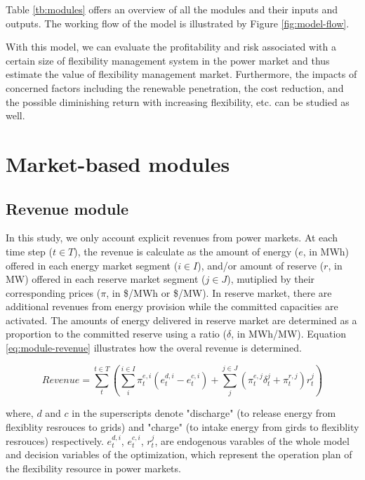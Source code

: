 Table \ref{tb:modules} offers an overview of all the modules and their inputs and outputs. The working flow of the model is illustrated by Figure \ref{fig:model-flow}.

With this model, we can evaluate the profitability and risk associated with a certain size of flexibility management system in the power market and thus estimate the value of flexibility management market. Furthermore, the impacts of concerned factors including the renewable penetration, the cost reduction, and the possible diminishing return with increasing flexibility, etc. can be studied as well.
\section{Market-based modules}

\subsection{Revenue module}

In this study, we only account explicit revenues from power markets. At each time step ($t \in T$), the revenue is calculate as the  amount of energy ($e$, in MWh) offered in each energy market segment ($i \in I$), and/or amount of reserve ($r$, in MW) offered in each reserve market segment ($j \in J$), mutiplied by their corresponding prices ($\pi$, in \$/MWh or \$/MW). In reserve market, there are additional revenues from energy provision while the committed capacities are activated. The amounts of energy delivered in reserve market are determined as a proportion to the committed reserve using a ratio ($\delta$, in MWh/MW). Equation \eqref{eq:module-revenue} illustrates how the overal revenue is determined. 

\begin{equation}
\label{eq:module-revenue}
Revenue = \sum_{t}^{t \in T} \left( \sum_{i}^{i \in I}  \pi_t^{e,i} (e_t^{d,i} - e_t^{c,i})  + \sum_{j}^{j \in J} (\pi_t^{e,j} \delta_t^{j} + \pi_t^{r,j}) r_t^j \right)
\end{equation}

where, $d$ and $c$ in the superscripts denote "discharge" (to release energy from flexiblity resrouces to grids) and "charge" (to intake energy from girds to flexiblity resrouces) respectively.  $e_t^{d,i}$, $e_t^{c,i}$, $r_t^{j}$, are endogenous varables of the whole model and decision variables of the optimization, which represent the operation plan of the flexibility resource in power markets.


